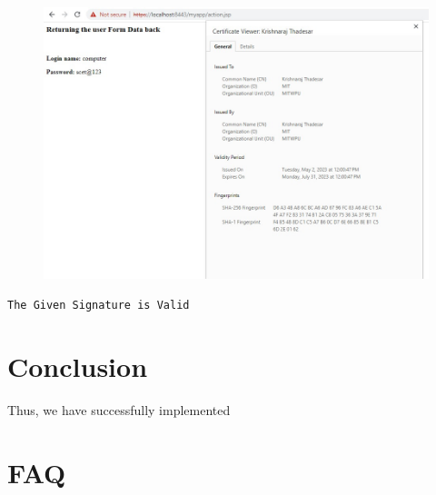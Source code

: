 \documentclass[openany]{book}
\begin{document}
\begin{figure}[H]
    \centering
    \includegraphics[width=.95\textwidth]{tomcat3.jpeg}
    \caption{}
\end{figure}
\begin{verbatim}
The Given Signature is Valid
\end{verbatim}


% 

\section{Conclusion}
Thus, we have successfully implemented
\clearpage

\section{FAQ}
\end{document}
